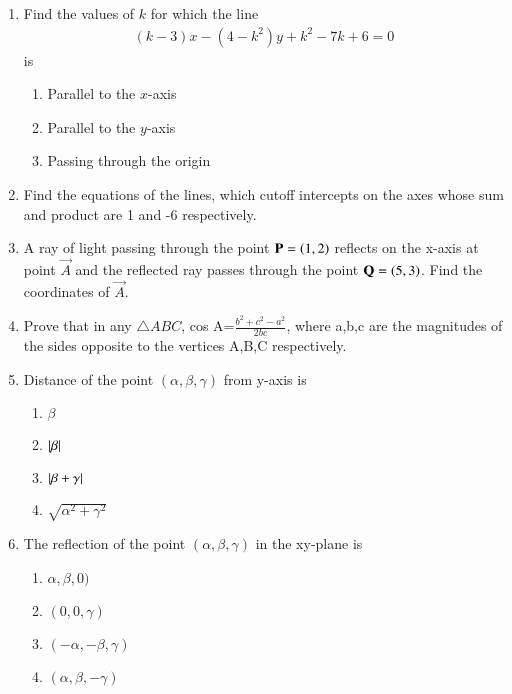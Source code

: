 \begin{enumerate}[label=\thesubsection.\arabic*,ref=\thesubsection.\theenumi]


\item Find the values of $k$ for which the line 
\begin{align}
(k-3)x-(4-k^2)y+k^2-7k+6=0 \label{eq:chapters/11/10/4/1/1}
\end{align}
is
\begin{enumerate}
\item Parallel to the $x$-axis
\item Parallel to the $y$-axis
\item Passing through the origin
\end{enumerate}
    \solution 
		
	\item Find the  equations of the lines, which cutoff intercepts on the axes  whose sum and product are 1 and -6 respectively.
\\
\solution
		
\item A ray of light passing through the point $\mathbf{P} = \left(1, 2\right)$ reflects on the x-axis at point $\vec{A}$ and the reflected ray passes through the point $\mathbf{Q} =\left(5, 3\right)$. Find the coordinates of $\vec{A}$.
\\
    \solution 
		
\item Prove that in any $\triangle{ABC}$, cos A=$\frac{b^2+c^2-a^2}{2bc}$, where a,b,c are the magnitudes of the sides opposite to the vertices A,B,C respectively.
\item Distance of the point $(\alpha, \beta, \gamma)$ from y-axis is
\begin{enumerate}
	\item $\beta$ 
	\item $\left\vert\beta\right\vert$
	\item $\left\vert\beta+\gamma\right\vert$
	\item $\sqrt{\alpha^2+\gamma^2}$
\end{enumerate}
\item The reflection of the point $(\alpha, \beta, \gamma )$ in the xy-plane is 
\begin{enumerate}
	\item $\alpha,\beta,0)$
	\item $(0,0,\gamma)$
	\item $(-\alpha,-\beta,\gamma)$
	\item $(\alpha,\beta,-\gamma)$
\end{enumerate}

\end{enumerate}
